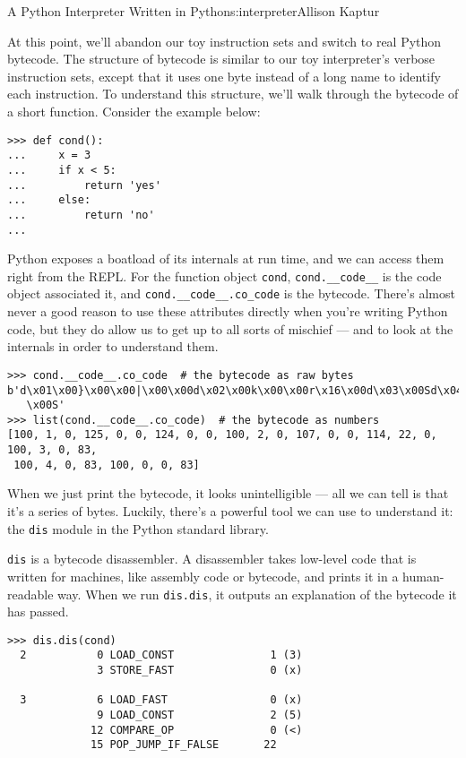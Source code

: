 \begin{aosachapter}{A Python Interpreter Written in Python}{s:interpreter}{Allison Kaptur}
\label{real-python-bytecode}

At this point, we'll abandon our toy instruction sets and switch to real
Python bytecode. The structure of bytecode is similar to our toy
interpreter's verbose instruction sets, except that it uses one byte
instead of a long name to identify each instruction. To understand this
structure, we'll walk through the bytecode of a short function. Consider
the example below:

\begin{verbatim}
>>> def cond():
...     x = 3
...     if x < 5:
...         return 'yes'
...     else:
...         return 'no'
...
\end{verbatim}

Python exposes a boatload of its internals at run time, and we can
access them right from the REPL. For the function object \texttt{cond},
\texttt{cond.\_\_code\_\_} is the code object associated it, and
\texttt{cond.\_\_code\_\_.co\_code} is the bytecode. There's almost
never a good reason to use these attributes directly when you're writing
Python code, but they do allow us to get up to all sorts of mischief ---
and to look at the internals in order to understand them.

\begin{verbatim}
>>> cond.__code__.co_code  # the bytecode as raw bytes
b'd\x01\x00}\x00\x00|\x00\x00d\x02\x00k\x00\x00r\x16\x00d\x03\x00Sd\x04\x00Sd\x00
   \x00S'
>>> list(cond.__code__.co_code)  # the bytecode as numbers
[100, 1, 0, 125, 0, 0, 124, 0, 0, 100, 2, 0, 107, 0, 0, 114, 22, 0, 100, 3, 0, 83, 
 100, 4, 0, 83, 100, 0, 0, 83]
\end{verbatim}

When we just print the bytecode, it looks unintelligible --- all we can
tell is that it's a series of bytes. Luckily, there's a powerful tool we
can use to understand it: the \texttt{dis} module in the Python standard
library.

\texttt{dis} is a bytecode disassembler. A disassembler takes low-level
code that is written for machines, like assembly code or bytecode, and
prints it in a human-readable way. When we run \texttt{dis.dis}, it
outputs an explanation of the bytecode it has passed.

\begin{verbatim}
>>> dis.dis(cond)
  2           0 LOAD_CONST               1 (3)
              3 STORE_FAST               0 (x)

  3           6 LOAD_FAST                0 (x)
              9 LOAD_CONST               2 (5)
             12 COMPARE_OP               0 (<)
             15 POP_JUMP_IF_FALSE       22


\end{verbatim}
\end{aosachapter}
